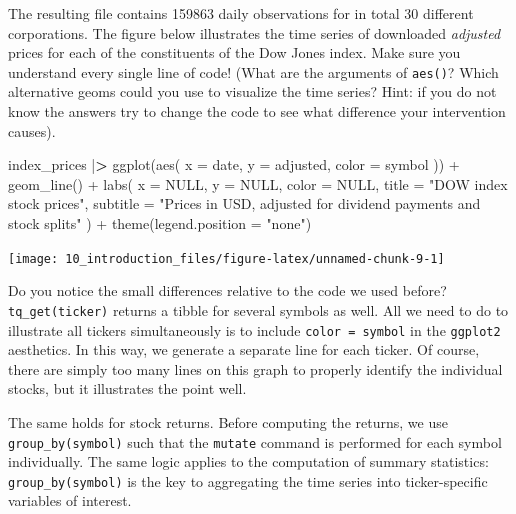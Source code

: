 \documentclass[
]{book}
\newenvironment{Shaded}{\begin{snugshade}}{\end{snugshade}}
\newcommand{\AttributeTok}[1]{\textcolor[rgb]{0.61,0.61,0.61}{#1}}
\newcommand{\ConstantTok}[1]{\textcolor[rgb]{0,0,0}{#1}}
\newcommand{\ErrorTok}[1]{\textcolor[rgb]{0.14,0.14,0.14}{\textbf{#1}}}
\newcommand{\FunctionTok}[1]{\textcolor[rgb]{0,0,0}{#1}}
\newcommand{\NormalTok}[1]{#1}
\newcommand{\SpecialCharTok}[1]{\textcolor[rgb]{0,0,0}{#1}}
\newcommand{\StringTok}[1]{\textcolor[rgb]{0.5,0.5,0.5}{#1}}
\begin{document}
The resulting file contains 159863 daily observations for in total 30 different corporations. The figure below illustrates the time series of downloaded \emph{adjusted} prices for each of the constituents of the Dow Jones index. Make sure you understand every single line of code! (What are the arguments of \texttt{aes()}? Which alternative geoms could you use to visualize the time series? Hint: if you do not know the answers try to change the code to see what difference your intervention causes).

\begin{Shaded}
\begin{Highlighting}[]
\NormalTok{index\_prices }\SpecialCharTok{|}\ErrorTok{\textgreater{}}
  \FunctionTok{ggplot}\NormalTok{(}\FunctionTok{aes}\NormalTok{(}
    \AttributeTok{x =}\NormalTok{ date,}
    \AttributeTok{y =}\NormalTok{ adjusted,}
    \AttributeTok{color =}\NormalTok{ symbol}
\NormalTok{  )) }\SpecialCharTok{+}
  \FunctionTok{geom\_line}\NormalTok{() }\SpecialCharTok{+}
  \FunctionTok{labs}\NormalTok{(}
    \AttributeTok{x =} \ConstantTok{NULL}\NormalTok{,}
    \AttributeTok{y =} \ConstantTok{NULL}\NormalTok{,}
    \AttributeTok{color =} \ConstantTok{NULL}\NormalTok{,}
    \AttributeTok{title =} \StringTok{"DOW index stock prices"}\NormalTok{,}
    \AttributeTok{subtitle =} \StringTok{"Prices in USD, adjusted for dividend payments and stock splits"}
\NormalTok{  ) }\SpecialCharTok{+}
  \FunctionTok{theme}\NormalTok{(}\AttributeTok{legend.position =} \StringTok{"none"}\NormalTok{)}
\end{Highlighting}
\end{Shaded}

\begin{center}\texttt{[image: 10\_introduction\_files/figure-latex/unnamed-chunk-9-1]} \end{center}

Do you notice the small differences relative to the code we used before? \texttt{tq\_get(ticker)} returns a tibble for several symbols as well. All we need to do to illustrate all tickers simultaneously is to include \texttt{color\ =\ symbol} in the \texttt{ggplot2} aesthetics. In this way, we generate a separate line for each ticker. Of course, there are simply too many lines on this graph to properly identify the individual stocks, but it illustrates the point well.

The same holds for stock returns. Before computing the returns, we use \texttt{group\_by(symbol)} such that the \texttt{mutate} command is performed for each symbol individually. The same logic applies to the computation of summary statistics: \texttt{group\_by(symbol)} is the key to aggregating the time series into ticker-specific variables of interest.
\end{document}
